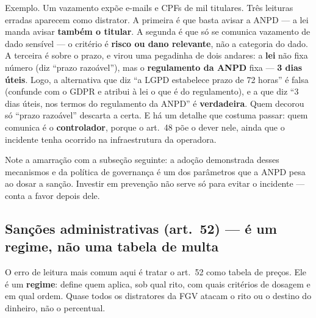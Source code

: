 Exemplo. Um vazamento expõe e-mails e CPFs de mil titulares. Três leituras
erradas aparecem como distrator. A primeira é que basta avisar a ANPD --- a
lei manda avisar \textbf{também o titular}. A segunda é que só se comunica
vazamento de dado sensível --- o critério é \textbf{risco ou dano relevante},
não a categoria do dado. A terceira é sobre o prazo, e virou uma pegadinha de
dois andares: a \textbf{lei} não fixa número (diz ``prazo razoável''), mas o
\textbf{regulamento da ANPD} fixa --- \textbf{3 dias úteis}. Logo, a
alternativa que diz ``a LGPD estabelece prazo de 72 horas'' é falsa (confunde
com o GDPR e atribui à lei o que é do regulamento), e a que diz ``3 dias
úteis, nos termos do regulamento da ANPD'' é \textbf{verdadeira}. Quem decorou
só ``prazo razoável'' descarta a certa. E há um
detalhe que costuma passar: quem comunica é o \textbf{controlador}, porque o
art.\ 48 põe o dever nele, ainda que o incidente tenha ocorrido na
infraestrutura da operadora.

Note a amarração com a subseção seguinte: a adoção demonstrada desses
mecanismos e da política de governança é um dos parâmetros que a ANPD pesa ao
dosar a sanção. Investir em prevenção não serve só para evitar o incidente ---
conta a favor depois dele.

\subsection{Sanções administrativas (art.\ 52) --- é um regime, não uma tabela de multa}

O erro de leitura mais comum aqui é tratar o art.\ 52 como tabela de preços.
Ele é um \textbf{regime}: define quem aplica, sob qual rito, com quais
critérios de dosagem e em qual ordem. Quase todos os distratores da FGV atacam
o rito ou o destino do dinheiro, não o percentual.

